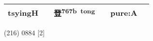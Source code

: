 \documentclass[14pt,a4paper]{scrartcl}
\begin{document}
\begin{longtable}[c]{@{}llllll@{}}
\begin{minipage}[t]{0.14\columnwidth}
tsyingH
\strut\end{minipage} &
\begin{minipage}[t]{0.14\columnwidth}\raggedright\strut
\strut\end{minipage} &
\begin{minipage}[t]{0.14\columnwidth}\raggedright\strut
登\textsuperscript{767b~tong}
\strut\end{minipage} &
\begin{minipage}[t]{0.14\columnwidth}\raggedright\strut
\strut\end{minipage} &
\begin{minipage}[t]{0.14\columnwidth}\raggedright\strut
pure:A
\strut\end{minipage}\tabularnewline
\bottomrule
\end{longtable}

(216) 0884 {[}2{]}
\end{document}
